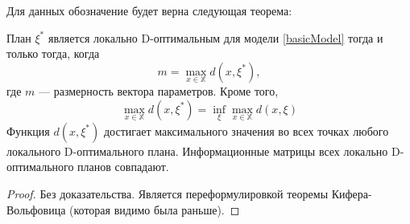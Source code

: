 Для данных обозначение будет верна следующая теорема:
\begin{thm}[Эквивалентности]
План $\xi^*$ является локально D-оптимальным для модели \eqref{basicModel} тогда и только тогда, когда 
$$ m = \max\limits_{x\in \mathbb{X}} d(x, \xi^*),$$
где $m$ --- размерность вектора параметров.
Кроме того, 
$$ \max \limits_{x \in \mathbb{X}} d(x, \xi^*) = \inf\limits_{\xi}\max\limits_{x\in\mathbb{X}} d(x, \xi)$$
Функция $d(x, \xi^*)$ достигает максимального значения во всех точках любого локального D-оптимального плана.
Информационные матрицы всех локально D-оптимального планов совпадают.
\end{thm}
\begin{proof}
Без доказательства. Является переформулировкой теоремы Кифера-Вольфовица (которая видимо была раньше).
\end{proof}




